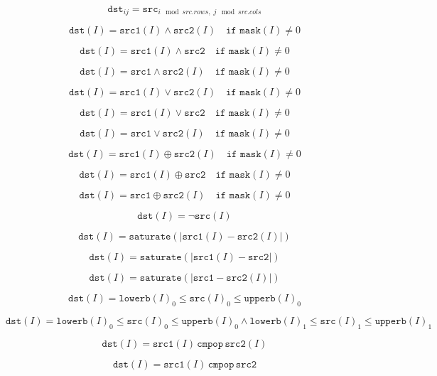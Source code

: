 \documentclass{article}
\begin{document}
\[\texttt{dst} _{ij}= \texttt{src} _{i\mod src.rows, \; j\mod src.cols }\]
\pagebreak

\[\texttt{dst} (I) =  \texttt{src1} (I)  \wedge \texttt{src2} (I) \quad \texttt{if mask} (I) \ne0\]
\pagebreak

\[\texttt{dst} (I) =  \texttt{src1} (I)  \wedge \texttt{src2} \quad \texttt{if mask} (I) \ne0\]
\pagebreak

\[\texttt{dst} (I) =  \texttt{src1}  \wedge \texttt{src2} (I) \quad \texttt{if mask} (I) \ne0\]
\pagebreak

\[\texttt{dst} (I) =  \texttt{src1} (I)  \vee \texttt{src2} (I) \quad \texttt{if mask} (I) \ne0\]
\pagebreak

\[\texttt{dst} (I) =  \texttt{src1} (I)  \vee \texttt{src2} \quad \texttt{if mask} (I) \ne0\]
\pagebreak

\[\texttt{dst} (I) =  \texttt{src1}  \vee \texttt{src2} (I) \quad \texttt{if mask} (I) \ne0\]
\pagebreak

\[\texttt{dst} (I) =  \texttt{src1} (I)  \oplus \texttt{src2} (I) \quad \texttt{if mask} (I) \ne0\]
\pagebreak

\[\texttt{dst} (I) =  \texttt{src1} (I)  \oplus \texttt{src2} \quad \texttt{if mask} (I) \ne0\]
\pagebreak

\[\texttt{dst} (I) =  \texttt{src1}  \oplus \texttt{src2} (I) \quad \texttt{if mask} (I) \ne0\]
\pagebreak

\[\texttt{dst} (I) =  \neg \texttt{src} (I)\]
\pagebreak

\[\texttt{dst}(I) =  \texttt{saturate} (| \texttt{src1}(I) -  \texttt{src2}(I)|)\]
\pagebreak

\[\texttt{dst}(I) =  \texttt{saturate} (| \texttt{src1}(I) -  \texttt{src2} |)\]
\pagebreak

\[\texttt{dst}(I) =  \texttt{saturate} (| \texttt{src1} -  \texttt{src2}(I) |)\]
\pagebreak

\[\texttt{dst} (I)= \texttt{lowerb} (I)_0  \leq \texttt{src} (I)_0 \leq  \texttt{upperb} (I)_0\]
\pagebreak

\[\texttt{dst} (I)= \texttt{lowerb} (I)_0  \leq \texttt{src} (I)_0 \leq  \texttt{upperb} (I)_0  \land \texttt{lowerb} (I)_1  \leq \texttt{src} (I)_1 \leq  \texttt{upperb} (I)_1\]
\pagebreak

\[\texttt{dst} (I) =  \texttt{src1} (I)  \,\texttt{cmpop}\, \texttt{src2} (I)\]
\pagebreak

\[\texttt{dst} (I) =  \texttt{src1}(I) \,\texttt{cmpop}\,  \texttt{src2}\]
\pagebreak
\end{document}
